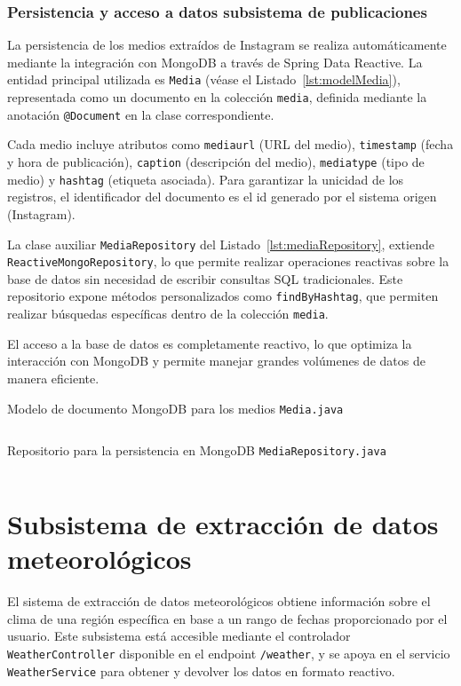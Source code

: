 \subsubsection{Persistencia y acceso a datos subsistema de publicaciones}
La persistencia de los medios extraídos de Instagram se realiza automáticamente mediante la integración con MongoDB a través de Spring Data Reactive. La entidad principal utilizada es \texttt{Media} (véase el Listado~\ref{lst:modelMedia}), representada como un documento en la colección \texttt{media}, definida mediante la anotación \texttt{@Document} en la clase correspondiente.

Cada medio incluye atributos como \texttt{mediaurl} (URL del medio), \texttt{timestamp} (fecha y hora de publicación), \texttt{caption} (descripción del medio), \texttt{mediatype} (tipo de medio) y \texttt{hashtag} (etiqueta asociada). Para garantizar la unicidad de los registros, el identificador del documento es el id generado por el sistema origen (Instagram).

La clase auxiliar \texttt{MediaRepository} del Listado~\ref{lst:mediaRepository}, extiende \texttt{ReactiveMongoRepository}, lo que permite realizar operaciones reactivas sobre la base de datos sin necesidad de escribir consultas SQL tradicionales. Este repositorio expone métodos personalizados como \texttt{findByHashtag}, que permiten realizar búsquedas específicas dentro de la colección \texttt{media}.

El acceso a la base de datos es completamente reactivo, lo que optimiza la interacción con MongoDB y permite manejar grandes volúmenes de datos de manera eficiente.

\begin{longlisting} 
\caption{Modelo de documento MongoDB para los medios {\tt Media.java}} 
\inputminted[firstline=6,lastline=30]{java}{../backend/PublicacionesAPI/PublicacionesAPI/src/main/java/es/uv/hemal/elrincondeeva/PublicacionesAPI/domain/Media.java} 
\label{lst:modelMedia} 
\end{longlisting}

\begin{longlisting} 
\caption{Repositorio para la persistencia en MongoDB {\tt MediaRepository.java}} 
\inputminted[firstline=5,lastline=9]{java}{../backend/PublicacionesAPI/PublicacionesAPI/src/main/java/es/uv/hemal/elrincondeeva/PublicacionesAPI/repositories/MediaRepository.java} 
\label{lst:mediaRepository} 
\end{longlisting}

\section{Subsistema de extracción de datos meteorológicos} 
El sistema de extracción de datos meteorológicos obtiene información sobre el clima de una región específica en base a un rango de fechas proporcionado por el usuario. Este subsistema está accesible mediante el controlador \texttt{WeatherController} disponible en el endpoint \texttt{/weather}, y se apoya en el servicio \texttt{WeatherService} para obtener y devolver los datos en formato reactivo.

